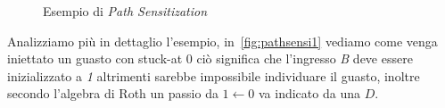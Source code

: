 \begin{figure}
\centering
{}
\caption{Esempio di \emph{Path Sensitization}}
\end{figure}
Analizziamo più in dettaglio l'esempio, in \figurename\,\ref{fig:pathsensi1} vediamo come venga iniettato un guasto con stuck-at 0 ciò significa che l'ingresso \emph{B} deve essere inizializzato a \emph{1} altrimenti sarebbe impossibile individuare il guasto, inoltre secondo l'algebra di Roth un passio da $1\leftarrow 0$ va indicato da una $D$.\\
